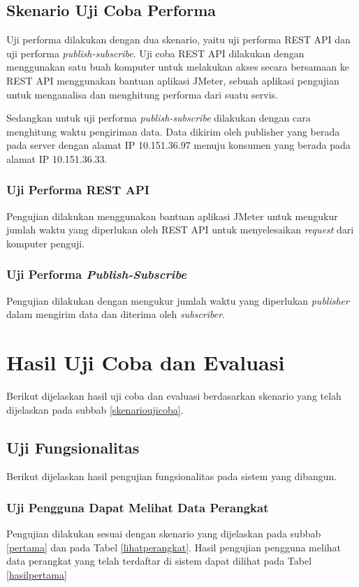 \subsection{Skenario Uji Coba Performa}
Uji performa dilakukan dengan dua skenario, yaitu uji performa REST API dan uji performa \textit{publish-subscribe}. Uji coba REST API dilakukan dengan menggunakan satu buah komputer untuk melakukan akses secara bersamaan ke REST API menggunakan bantuan aplikasi JMeter, sebuah aplikasi pengujian untuk menganalisa dan menghitung performa dari suatu servis.

Sedangkan untuk uji performa \textit{publish-subscribe} dilakukan dengan cara menghitung waktu pengiriman data. Data dikirim oleh publisher yang berada pada server dengan alamat IP 10.151.36.97 menuju konsumen yang berada pada alamat IP 10.151.36.33.

\subsubsection{Uji Performa REST API}
Pengujian dilakukan menggunakan bantuan aplikasi JMeter untuk mengukur jumlah waktu yang diperlukan oleh REST API untuk menyelesaikan \textit{request} dari komputer penguji.

\subsubsection{Uji Performa \textit{Publish-Subscribe}}
Pengujian dilakukan dengan mengukur jumlah waktu yang diperlukan \textit{publisher} dalam mengirim data dan diterima oleh \textit{subscriber}.

    
\section{Hasil Uji Coba dan Evaluasi}
Berikut dijelaskan hasil uji coba dan evaluasi berdasarkan skenario yang telah dijelaskan pada subbab \ref{skenarioujicoba}.
    
\subsection{Uji Fungsionalitas}
Berikut dijelaskan hasil pengujian fungsionalitas pada sistem yang dibangun.

\subsubsection{Uji Pengguna Dapat Melihat Data Perangkat}
Pengujian dilakukan sesuai dengan skenario yang dijelaskan pada subbab \ref{pertama} dan pada Tabel \ref{lihatperangkat}. Hasil pengujian pengguna melihat data perangkat yang telah terdaftar di sistem dapat dilihat pada Tabel \ref{hasilpertama}

